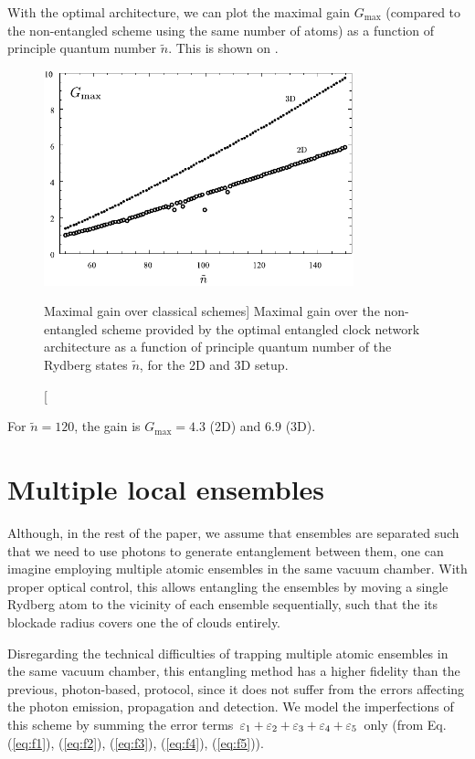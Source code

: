 With the optimal architecture, we can plot the maximal gain $G_\mathrm{max}$
(compared to the non-entangled scheme using the same number of atoms) as a
function of principle quantum number $\tilde n$.
This is shown on .
\begin{figure}[h]
\centering
\includegraphics[width=0.8\textwidth]{./figs_Komar2015/gain_2d3d.pdf}
\caption
[Maximal gain over classical schemes]
{
\label{fig:gain}
Maximal gain over the non-entangled scheme provided by the optimal entangled
clock network architecture as a function of principle quantum number of the
Rydberg states $\tilde n$, for the 2D and 3D setup.}
\end{figure}
For $\tilde n = 120$, the gain is $G_\mathrm{max} = 4.3$ (2D) and $6.9$ (3D).


\section{Multiple local ensembles}
Although, in the rest of the paper, we assume that ensembles are separated such
that we need to use photons to generate entanglement between them, one can
imagine employing multiple atomic ensembles in the same vacuum chamber. With
proper optical control, this allows entangling the ensembles by moving a single
Rydberg atom to the vicinity of each ensemble sequentially, such that the its
blockade radius covers one the of clouds entirely.

Disregarding the technical difficulties of trapping multiple atomic ensembles in
the same vacuum chamber, this entangling method has a higher fidelity than the
previous, photon-based, protocol, since it does not suffer from the errors
affecting the photon emission, propagation and detection. We model the
imperfections of this scheme by summing the error terms $\varepsilon_1 + \varepsilon_2 +
\varepsilon_3 + \varepsilon_4 + \varepsilon_5$ only (from Eq.
(\ref{eq:f1}), (\ref{eq:f2}), (\ref{eq:f3}), (\ref{eq:f4}), (\ref{eq:f5})).

